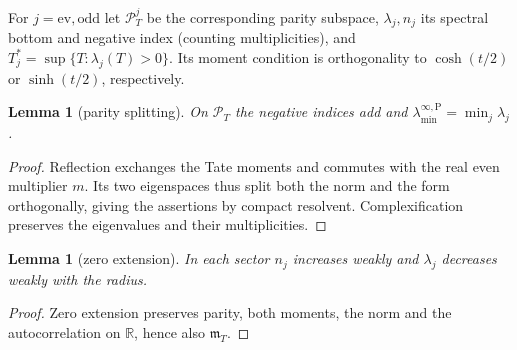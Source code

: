 \documentclass[10pt]{amsart}
\newtheorem{lemma}[theorem]{Lemma}
\theoremstyle{definition}
\theoremstyle{remark}
\newcommand{\PT}{\mathcal P_T}
\newcommand{\mT}{\mathfrak m_T}
\newcommand{\laminfP}{\lambda^{\infty,\mathrm P}_{\min}}
\begin{document}
For $j=\mathrm{ev},\mathrm{odd}$ let $\PT^j$ be the corresponding parity
subspace, $\lambda_j,n_j$ its spectral bottom and negative index
(counting multiplicities), and $T_j^*=\sup\{T:\lambda_j(T)>0\}$.
Its moment condition is orthogonality to $\cosh(t/2)$ or $\sinh(t/2)$,
respectively.

\begin{lemma}[parity splitting]\label{lem:parity}
On $\PT$ the negative indices add and $\laminfP=\min_j\lambda_j$.
\end{lemma}
\begin{proof}
Reflection exchanges the Tate moments and commutes with the real even
multiplier $m$. Its two eigenspaces thus split both the norm and the form
orthogonally, giving the assertions by compact resolvent. Complexification
preserves the eigenvalues and their multiplicities.
\end{proof}

\begin{lemma}[zero extension]\label{lem:zeroext}
In each sector $n_j$ increases weakly and $\lambda_j$ decreases weakly
with the radius.
\end{lemma}
\begin{proof}
Zero extension preserves parity, both moments, the norm and the
autocorrelation on $\mathbb R$, hence also $\mT$.
\end{proof}
\end{document}

